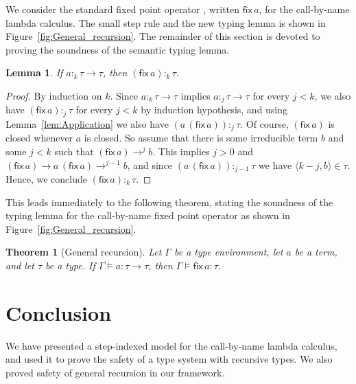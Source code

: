 \documentclass[10pt,a4paper,final,twocolumn]{article}
\theoremstyle{definition}
\theoremstyle{plain}
\newtheorem{lemma}[definition]{Lemma}
\newtheorem{theorem}[definition]{Theorem}
\newcommand{\app}[2]{\ensuremath{{#1}\,{#2}}}
\newcommand{\fix}[1]{\ensuremath{\mathsf{fix}\,{#1}}}
\newcommand{\pair}[1]{\ensuremath{\langle{#1}\rangle}}
\begin{document}
We consider the standard fixed point operator \cite{Pierce02}, written $\fix{a}$, for the
call-by-name lambda calculus. The small step rule and the new typing lemma is shown in
Figure~\ref{fig:General_recursion}. The remainder of this section is devoted to proving the
soundness of the semantic typing lemma.

\begin{lemma}
  If $a :_k \tau \to \tau$, then $(\fix{a}) :_k \tau$.
\end{lemma}

\begin{proof}
  By induction on $k$. Since \mbox{$a :_k \tau \to \tau$} implies \mbox{$a :_j \tau \to \tau$} for every
  \mbox{$j < k$}, we also have \mbox{$(\fix{a}) :_j \tau$} for every \mbox{$j < k$} by induction hypothesis, and using
  Lemma~\ref{lem:Application} we also have \mbox{$(\app{a}{(\fix{a})}) :_j \tau$}. Of course,
  \mbox{$(\fix{a})$} is closed whenever $a$ is closed. So assume that there is some irreducible term
  $b$ and some \mbox{$j < k$} such that \mbox{$(\fix{a}) \to^j b$}.
  This implies \mbox{$j > 0$} and \mbox{$(\fix{a}) \to \app{a}{(\fix{a})} \to^{j-1} b$}, and since
  \mbox{$(\app{a}{(\fix{a})}) :_{j-1} \tau$} we have \mbox{$\pair{k-j,b} \in \tau$}. Hence, we conclude
  \mbox{$(\fix{a}) :_k \tau$}.
\end{proof}

This leads immediately to the following theorem, stating the soundness of the typing lemma
for the call-by-name fixed point operator as shown in Figure~\ref{fig:General_recursion}.

\begin{theorem}[General recursion]
  Let $\Gamma$ be a type environment, let $a$ be a term, and let $\tau$ be a type.
  If \mbox{$\Gamma \models a : \tau \to \tau$}, then \mbox{$\Gamma \models \fix{a} : \tau$}.
\end{theorem}


\section{Conclusion}
\label{sec:Conclusion}


We have presented a step-indexed model for the call-by-name lambda calculus, and used it to
prove the safety of a type system with recursive types. We also proved safety of general
recursion in our framework.




\end{document}

